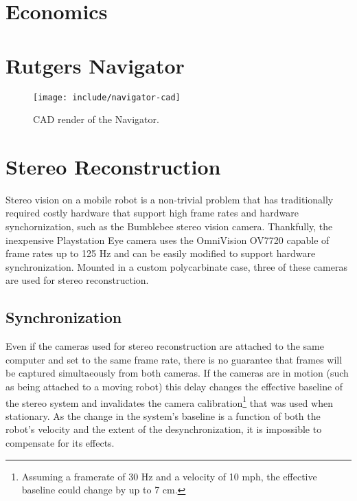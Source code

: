 \documentclass[11pt,twocolumn]{article}
\begin{document}
\section{Economics}
\label{sec:econ}

\section{Rutgers Navigator}
\label{sec:robot}

\begin{figure}
	\centering
	\texttt{[image: include/navigator-cad]}
	\caption{CAD render of the Navigator.}
	\label{fig:robot-cad}
\end{figure}


\section{Stereo Reconstruction}
\label{sec:stereo}
Stereo vision on a mobile robot is a non-trivial problem that has traditionally
required costly hardware that support high frame rates and hardware
synchornization, such as the Bumblebee stereo vision camera. Thankfully, the
inexpensive Playstation Eye camera uses the OmniVision OV7720 capable of frame
rates up to 125 Hz and can be easily modified to support hardware
synchronization. Mounted in a custom polycarbinate case, three of these cameras
are used for stereo reconstruction.

\subsection{Synchronization}
\label{sec:stereo-sync}
Even if the cameras used for stereo reconstruction are attached to the same
computer and set to the same frame rate, there is no guarantee that frames will
be captured simultaeously from both cameras. If the cameras are in motion (such
as being attached to a moving robot) this delay changes the effective baseline
of the stereo system and invalidates the camera calibration\footnote{Assuming a
framerate of 30 Hz and a velocity of 10 mph, the effective baseline could change
by up to 7 cm.} that was used when stationary. As the change in the system's
baseline is a function of both the robot's velocity and the extent of the
desynchronization, it is impossible to compensate for its effects.
\end{document}
